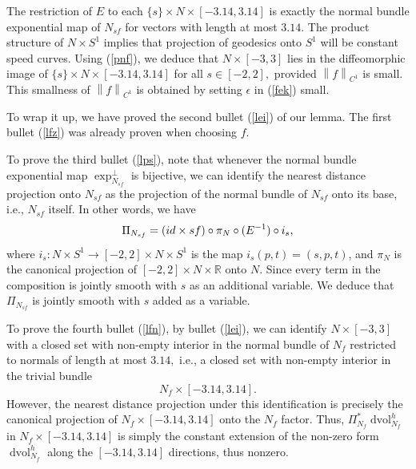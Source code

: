 \documentclass[11pt,a4paper]{amsart}
\numberwithin{equation}{section}
\newcommand{\e}{\epsilon}
\newcommand{\no}[1]{\left\lVert#1\right\rVert}
\newcommand{\dvol}{\operatorname{dvol}}
\newcommand{\du}{^\ast}
\newcommand{\m}{^{-1}}
\newcommand{\R}{\mathbb{R}}
\newcommand{\id}{\textnormal{id}}
\theoremstyle{plain}
\theoremstyle{definition}
\numberwithin{equation}{subsection}
\begin{document}
The restriction of $E$ to each $\{s\}\times N\times[-3.14,3.14]$ is exactly the normal bundle exponential map of $N_{sf}$ for vectors with length at most $3.14.$ The product structure of $N\times S^1$ implies that projection of geodesics onto $S^1$ will be constant speed curves. Using (\ref{pnf}), we deduce that $N\times[-3,3]$ lies in the diffeomorphic image of $\{s\}\times N\times[-3.14,3.14]$ for all $s\in[-2,2],$ provided $\no{f}_{C^1}$ is small. This smallness of $\no{f}_{C^1}$ is obtained by setting $\e$ in (\ref{fek}) small.

To wrap it up, we have proved the second bullet (\ref{lei}) of our lemma. The first bullet (\ref{lfz}) was already proven when choosing $f.$


To prove the third bullet (\ref{lps}), note that whenever the normal bundle exponential map $\exp^\perp_{N_{sf}}$ is bijective, we can identify the nearest distance projection onto $N_{sf}$ as the projection of the normal bundle of $N_{sf}$ onto its base, i.e., $N_{sf}$ itself. %
In other words, we have
\begin{align*}
\Pi_{N_{sf}}=(\id\times sf)\circ\pi_N\circ(E\m)\circ i_s,
\end{align*}where $i_s:N\times S^1\to [-2,2]\times N\times S^1$ is the map $i_s(p,t)=(s,p,t)$, and $\pi_N$ is the canonical projection of $[-2,2]\times N\times \R$ onto $N.$ Since every term in the composition is jointly smooth with $s$ as an additional variable. We deduce that $\Pi_{N_{sf}}$ is jointly smooth with $s$ added as a variable.

To prove the fourth bullet (\ref{lfn}), %
by bullet (\ref{lei}), we can identify $N\times[-3,3]$ with a closed set with non-empty interior in the normal bundle of $N_f$ restricted to normals of length at most $3.14,$ i.e., a closed set with non-empty interior in the trivial bundle $$N_f\times [-3.14,3.14].$$ However, the nearest distance projection under this identification is precisely the canonical projection of $N_f\times [-3.14,3.14]$  onto the $N_f$ factor. Thus, $\Pi_{N_f}\du \dvol^h_{N_f}$ in $N_f\times[-3.14,3.14]$ is simply the constant extension of the non-zero form $\dvol^h_{N_f}$ along the $[-3.14,3.14]$ directions, thus nonzero.
\end{document}
